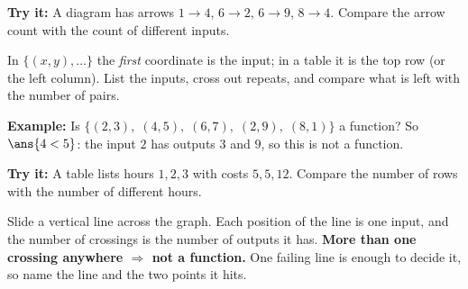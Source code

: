 \documentclass[12pt]{article}
\begin{document}
\begin{tryitbox}
\textbf{Try it:} A diagram has arrows $1 \rightarrow 4$, $6 \rightarrow 2$,
$6 \rightarrow 9$, $8 \rightarrow 4$. Compare the arrow count with the count of
different inputs.\\[2pt]
\end{tryitbox}


\begin{formulabox}
In $\{(x,y),\dots\}$ the \emph{first} coordinate is the input; in a table it is
the top row (or the left column). List the inputs, cross out repeats, and
compare what is left with the number of pairs.
\end{formulabox}

\begin{examplebox}
\textbf{Example:} Is $\{(2,3),\;(4,5),\;(6,7),\;(2,9),\;(8,1)\}$ a function?
So $\ans{4 < 5}$: the input $2$ has outputs $3$ and $9$, so this is not a
function.
\end{examplebox}

\begin{tryitbox}
\textbf{Try it:} A table lists hours $1, 2, 3$ with costs $5, 5, 12$. Compare
the number of rows with the number of different hours.\\[2pt]
\end{tryitbox}


\begin{formulabox}
Slide a vertical line across the graph. Each position of the line is one input,
and the number of crossings is the number of outputs it has. \textbf{More than
one crossing anywhere $\Rightarrow$ not a function.} One failing line is enough
to decide it, so name the line and the two points it hits.
\end{formulabox}
\end{document}
